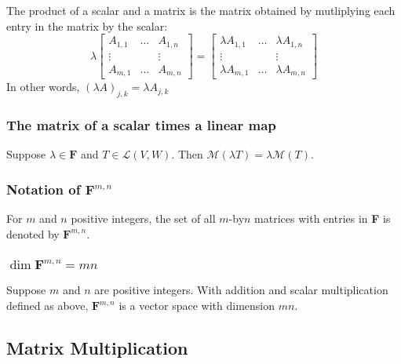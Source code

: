 \documentclass[11pt]{article}
\begin{document}
    The product of a scalar and a matrix is the matrix obtained by mutliplying each entry in the matrix by the scalar:
    \begin{equation*}
        \lambda \begin{bmatrix}
                    A_{1,1} & \dots & A_{1,n} \\
                    \vdots  &       &  \vdots \\
                    A_{m,1} & \dots & A_{m,n}
                \end{bmatrix} = \begin{bmatrix}
                                    \lambda A_{1,1} & \dots & \lambda A_{1,n} \\
                                    \vdots          &       & \vdots \\
                                    \lambda A_{m,1} & \dots & \lambda A_{m,n}
                                \end{bmatrix}
    \end{equation*}
    In other words, \((\lambda A)_{j,k} = \lambda A_{j,k}\)

    \subsubsection{The matrix of a scalar times a linear map}

    Suppose \(\lambda \in \textbf{F}\) and \(T \in \mathcal{L}(V,W)\). Then \(\mathcal{M}(\lambda T) = \lambda \mathcal{M}(T)\). 

    \subsubsection{Notation of \(\textbf{F}^{m,n}\)}

    For $m$ and $n$ positive integers, the set of all $m$-by$n$ matrices with entries in \textbf{F} is denoted by \(\textbf{F}^{m,n}\).

    \subsubsection{\(\dim \textbf{F}^{m,n} = mn\)}

    Suppose $m$ and $n$ are positive integers. With addition and scalar multiplication defined as above, \(\textbf{F}^{m,n}\) is a vector space with dimension $mn$. 

    \subsection{Matrix Multiplication}
\end{document}
